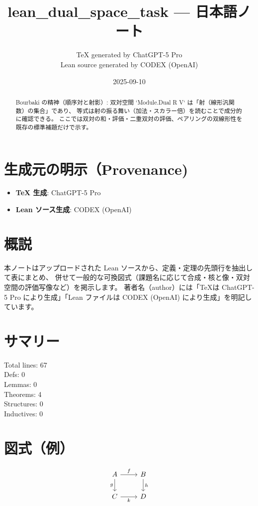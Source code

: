 \documentclass[12pt]{article}
\title{lean\_dual\_space\_task — 日本語ノート}
\author{TeX generated by ChatGPT-5 Pro\\Lean source generated by CODEX (OpenAI)}
\date{2025-09-10}
\begin{document}
\maketitle

\begin{abstract}
Bourbaki の精神（順序対と射影）:
  双対空間 `Module.Dual R V` は「射（線形汎関数）の集合」であり、
  等式は射の振る舞い（加法・スカラー倍）を読むことで成分的に確認できる。
  ここでは双対の和・評価・二重双対の評価、ペアリングの双線形性を
  既存の標準補題だけで示す。
\end{abstract}

\section*{生成元の明示（Provenance)}
\begin{itemize}
  \item \textbf{TeX 生成}: ChatGPT-5 Pro
  \item \textbf{Lean ソース生成}: CODEX (OpenAI)
\end{itemize}

\section*{概説}
本ノートはアップロードされた Lean ソースから、定義・定理の先頭行を抽出して表にまとめ、
併せて一般的な可換図式（課題名に応じて合成・核と像・双対空間の評価写像など）を掲示します。
著者名（author）には「TeXは ChatGPT-5 Pro により生成」「Lean ファイルは CODEX (OpenAI) により生成」を明記しています。

\section*{サマリー}
Total lines: 67\\
Defs: 0\\
Lemmas: 0\\
Theorems: 4\\
Structures: 0\\
Inductives: 0

\section*{図式（例）}

\[
\begin{tikzcd}
A \arrow[r, "f"] \arrow[d, "g"'] & B \arrow[d, "h"] \\
C \arrow[r, "k"'] & D
\end{tikzcd}
\]
\end{document}
